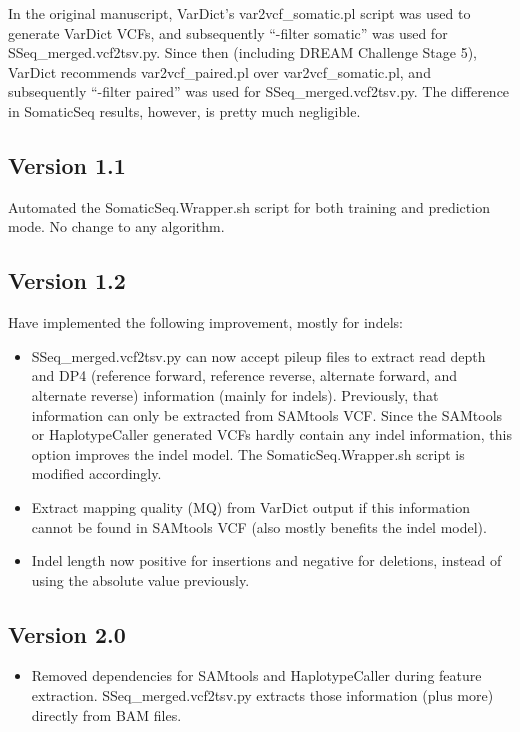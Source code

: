 \documentclass[10pt,letterpaper]{article}
\begin{document}
\begin{sloppypar}
In the original manuscript, VarDict's var2vcf\_somatic.pl script was used to generate VarDict VCFs, and subsequently ``-filter somatic'' was used for SSeq\_merged.vcf2tsv.py. Since then (including DREAM Challenge Stage 5), VarDict recommends var2vcf\_paired.pl over var2vcf\_somatic.pl, and subsequently ``-filter paired'' was used for SSeq\_merged.vcf2tsv.py. The difference in SomaticSeq results, however, is pretty much negligible. 

\subsection{Version 1.1}
Automated the SomaticSeq.Wrapper.sh script for both training and prediction mode. No change to any algorithm. 

\subsection{Version 1.2}
Have implemented the following improvement, mostly for indels:

\begin{itemize}
 
  \item 
  SSeq\_merged.vcf2tsv.py can now accept pileup files to extract read depth and DP4 (reference forward, reference reverse, alternate forward, and alternate reverse) information (mainly for indels). Previously, that information can only be extracted from SAMtools VCF. Since the SAMtools or HaplotypeCaller generated VCFs hardly contain any indel information, this option improves the indel model. The SomaticSeq.Wrapper.sh script is modified accordingly.
 
  \item
  Extract mapping quality (MQ) from VarDict output if this information cannot be found in SAMtools VCF (also mostly benefits the indel model). 
 
  \item
  Indel length now positive for insertions and negative for deletions, instead of using the absolute value previously. 
 
 
\end{itemize}




\subsection{Version 2.0}

\begin{itemize}
  \item
  Removed dependencies for SAMtools and HaplotypeCaller during feature extraction. SSeq\_merged.vcf2tsv.py extracts those information (plus more) directly from BAM files.


\end{itemize}
\end{sloppypar}
\end{document}
